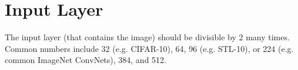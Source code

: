 \chapter{Input Layer}
The input layer (that contains the image) should be divisible by 2 many times. Common numbers include 32 (e.g. CIFAR-10), 64, 96 (e.g. STL-10), or 224 (e.g. common ImageNet ConvNets), 384, and 512.